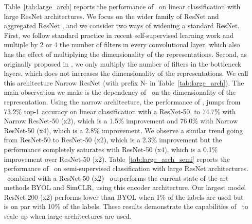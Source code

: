 Table~\ref{tab:large_arch} reports the performance of \algo \ on linear classification with large ResNet architectures. We focus on the wider family of ResNet \cite{zagoruyko2016resnetwide} and aggregated ResNet \cite{xie2017resnext}, and we consider two ways of widening a standard ResNet. First, we follow standard practice in recent self-supervised learning work \cite{caron2020swav, grill2020byol, chen2020simclr} and multiple by 2 or 4 the number of filters in every convolutional layer, which also has the effect of multiplying the dimensionality of the representations. Second, as originally proposed in \cite{zagoruyko2016resnetwide}, we only multiply the number of filters in the bottleneck layers, which does not increases the dimensionality of the representations. We call this architecture Narrow ResNet (with prefix N- in Table~\ref{tab:large_arch}). The main observation we make is the dependency of \algo \ on the dimensionality of the representation. Using the narrow architecture, the performance of \algo, jumps from 73.2\% top-1 accuracy on linear classification with a ResNet-50, to 74.7\% with Narrow ResNet-50 (x2), which is a 1.5\% improvement and 76.0\% with Narrow ResNet-50 (x4), which is a 2.8\% improvement. We observe a similar trend going from ResNet-50 to ResNet-50 (x2), which is a 2.3\% improvement but the performance completely saturates with ResNet-50 (x4), which is a 0.1\% improvement over ResNet-50 (x2). Table~\ref{tab:large_arch_semi} reports the performance of \algo \ on semi-supervised classification with large ResNet architectures. \algo \ combined with a ResNet-50 (x2) \ outperforms the current state-of-the-art methods BYOL and SimCLR, using this encoder architecture. Our largest model ResNet-200 (x2) performs lower than BYOL when 1\% of the labels are used but is on par with 10\% of the labels. These results demonstrate the capabilities of \algo \ to scale up when large architectures are used.


